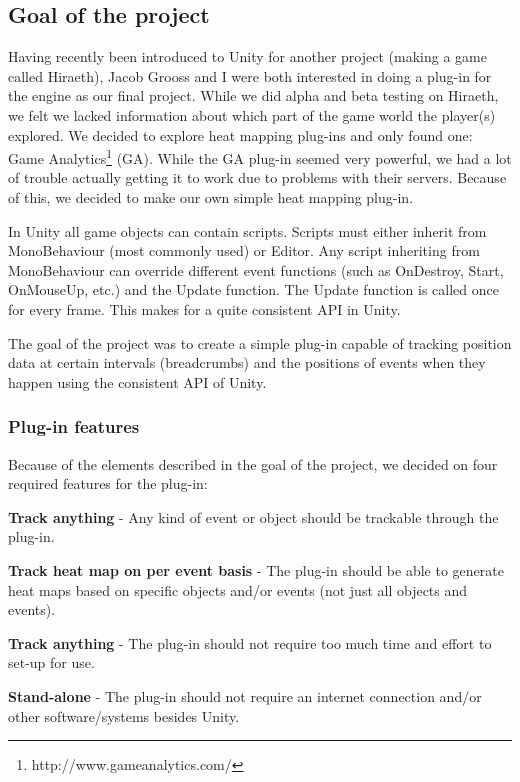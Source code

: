 \subsection{Goal of the project}
\label{PO_goal}
Having recently been introduced to Unity for another project (making a game called Hiraeth), Jacob Grooss and I were both interested in doing a plug-in for the engine as our final project. While we did alpha and beta testing on Hiraeth, we felt we lacked information about which part of the game world the player(s) explored. We decided to explore heat mapping plug-ins and only found one: Game Analytics\footnote{http://www.gameanalytics.com/} (GA). While the GA plug-in seemed very powerful, we had a lot of trouble actually getting it to work due to problems with their servers. Because of this, we decided to make our own simple heat mapping plug-in.

In Unity all game objects can contain scripts. Scripts must either inherit from MonoBehaviour (most commonly used) or Editor. Any script inheriting from MonoBehaviour can override different event functions (such as OnDestroy, Start, OnMouseUp, etc.) and the Update function. The Update function is called once for every frame. This makes for a quite consistent API in Unity.

The goal of the project was to create a simple plug-in capable of tracking position data at certain intervals (breadcrumbs) and the positions of events when they happen using the consistent API of Unity. 

\subsubsection{Plug-in features}
\label{PO_features}
Because of the elements described in the goal of the project, we decided on four required features for the plug-in:
\begin{my_itemize}
\item \textbf{Track anything} - Any kind of event or object should be trackable through the plug-in.
\item \textbf{Track heat map on per event basis} - The plug-in should be able to generate heat maps based on specific objects and/or events (not just all objects and events).
\item \textbf{Track anything} - The plug-in should not require too much time and effort to set-up for use.
\item \textbf{Stand-alone} - The plug-in should not require an internet connection and/or other software/systems besides Unity.
\end{my_itemize}
